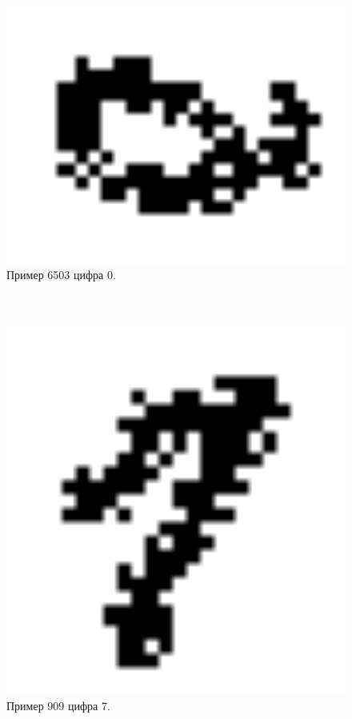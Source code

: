 \documentclass[oneside,final,14pt]{extreport}
\begin{document}
\\
\begin{figure}
    \centering
    \includegraphics[width=1.0\textwidth]{6503_0.eps}
    \caption{Пример 6503 цифра 0.}
    \label{fig:6503_0}
\end{figure}
\\
\begin{figure}
    \centering
    \includegraphics[width=1.0\textwidth]{909_7.eps}
    \caption{Пример 909 цифра 7.}
    \label{fig:909_7}
\end{figure}
\\
\\
\\
\end{document}
